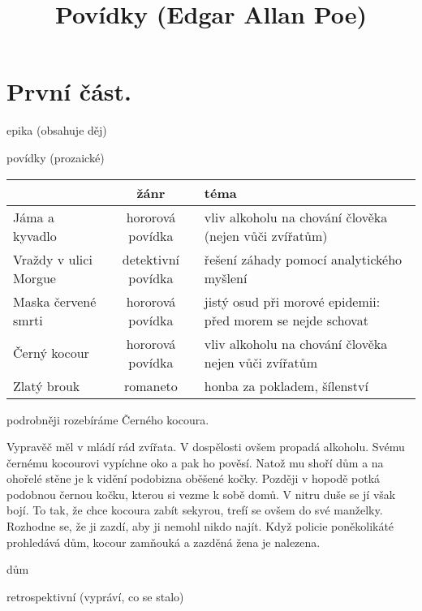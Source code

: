 \documentclass{article}
\title{\vspace{-2cm}Povídky (Edgar Allan Poe)\vspace{-2cm}}
\date{}
\author{}
\begin{document}
\maketitle
\section{První část.}
\begin{description}
    \setlength\itemsep{0.15em}
    \item[druh:] epika (obsahuje děj)
    \item[žánr:] povídky (prozaické)
    \begin{center}
      \begin{tabular}{ l || c | l }
       & žánr & téma \\\hline
       Jáma a kyvadlo & hororová povídka & vliv alkoholu na chování člověka (nejen vůči zvířatům) \\
       Vraždy v ulici Morgue & detektivní povídka & řešení záhady pomocí analytického myšlení \\
       Maska červené smrti & hororová povídka & jistý osud při morové epidemii: před morem se nejde schovat \\
       Černý kocour & hororová povídka & vliv alkoholu na chování člověka nejen vůči zvířatům \\
       Zlatý brouk & romaneto \footnotemark & honba za pokladem, šílenství
      \end{tabular}
    \end{center}
    \item[$-$] podrobněji rozebíráme Černého kocoura.
    \item[zařazení výňatku do kontextu díla:] Vypravěč měl v mládí rád zvířata. V dospělosti ovšem propadá alkoholu. Svému černému kocourovi vypíchne oko a pak ho pověsí. Natož mu shoří dům a na ohořelé stěne je k vidění podobizna oběšené kočky. Později v hopodě potká podobnou černou kočku, kterou si vezme k sobě domů. V nitru duše se jí však bojí. To tak, že chce kocoura zabít sekyrou, trefí se ovšem do své manželky. Rozhodne se, že ji zazdí, aby ji nemohl nikdo najít. Když policie poněkolikáté prohledává dům, kocour zamňouká a zazděná žena je nalezena.
    \item[časoprostor:] dům
    \item[kompoziční výstavba:] retrospektivní (vypráví, co se stalo)
\end{description}
\end{document}
